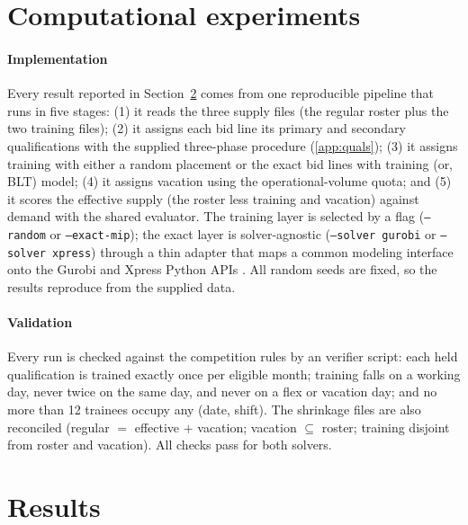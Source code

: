 \documentclass[preprint,12pt]{elsarticle}
\begin{document}
\section{Computational experiments} \label{sec:computational_experiments}
   \paragraph{Implementation} Every result reported in Section~\ref{sec:results} comes from one reproducible pipeline that runs in five stages: (1) it reads the three supply files (the regular roster plus the two training files); (2) it assigns each bid line its primary and secondary qualifications with the supplied three-phase procedure (\ref{app:quals}); (3) it assigns training with either a random placement or the exact bid lines with training (or, BLT) model; (4) it assigns vacation using the operational-volume quota; and (5) it scores the effective supply (the roster less training and vacation) against demand with the shared evaluator. The training layer is selected by a flag (\texttt{---random} or \texttt{---exact-mip}); the exact layer is solver-agnostic (\texttt{---solver gurobi} or \texttt{---solver xpress}) through a thin adapter that maps a common modeling interface onto the Gurobi and Xpress Python APIs \citep{gurobi2026,xpress2026}. All random seeds are fixed, so the results reproduce from the supplied data.

   \paragraph{Validation} Every run is checked against the competition rules by an verifier script: each held qualification is trained exactly once per eligible month; training falls on a working day, never twice on the same day, and never on a flex or vacation day; and no more than 12 trainees occupy any (date, shift). The shrinkage files are also reconciled (regular $=$ effective $+$ vacation; vacation $\subseteq$ roster; training disjoint from roster and vacation). All checks pass for both solvers.

\section{Results} \label{sec:results}
\end{document}
